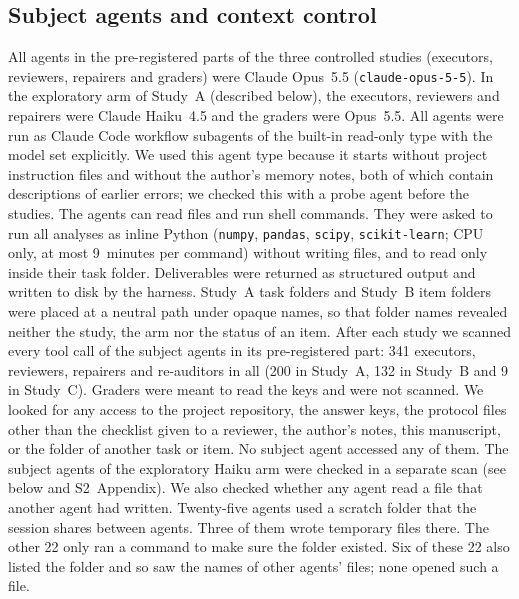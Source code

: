 \documentclass[10pt,letterpaper]{article}
\begin{document}
\subsection*{Subject agents and context control}
All agents in the pre-registered parts of the three controlled studies
(executors, reviewers, repairers and graders) were Claude Opus~5.5
(\texttt{claude-opus-5-5}). In the exploratory arm of Study~A (described
below), the executors, reviewers and repairers were Claude Haiku~4.5 and
the graders were Opus~5.5. All agents were run as Claude Code workflow
subagents of the built-in read-only type with the model set explicitly.
We used this agent type because it starts
without project instruction files and without the author's memory notes,
both of which contain descriptions of earlier errors; we checked this with
a probe agent before the studies. The agents can read files and run
shell commands. They were asked to run all analyses as inline Python
(\texttt{numpy}, \texttt{pandas}, \texttt{scipy}, \texttt{scikit-learn};
CPU only, at most 9~minutes per command) without writing files, and to
read only inside their task folder. Deliverables were returned as
structured output and written to disk by the harness. Study~A task folders and Study~B item folders were placed
at a neutral path under opaque names, so that folder names revealed
neither the study, the arm nor the status of an item. After each study we
scanned every tool call of the subject agents in its pre-registered part:
341 executors, reviewers, repairers and re-auditors in all (200 in
Study~A, 132 in Study~B and 9 in Study~C). Graders were meant to read the
keys and were not scanned. We looked for any access to the project
repository, the answer keys, the protocol files other than the checklist
given to a reviewer, the author's notes, this manuscript, or the folder
of another task or item. No subject agent accessed any of them. The
subject agents of the exploratory Haiku arm were checked in a separate
scan (see below and S2~Appendix). We also checked whether any agent
read a file that another agent had written. Twenty-five agents used a
scratch folder that the session shares between agents. Three of them
wrote temporary files there. The other 22 only ran a command to make sure
the folder existed. Six of these 22 also listed the folder and so saw the
names of other agents' files; none opened such a file.
\end{document}
